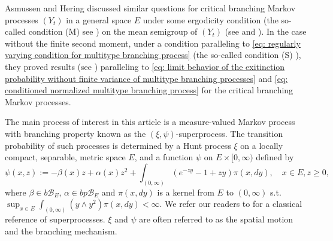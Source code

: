 \documentclass[12pt, a4paper]{amsart}
\theoremstyle{definition}
\numberwithin{equation}{section}
\begin{document}
	Asmussen and Hering \cite{AsmussenHering1983Branching} discussed similar questions for critical branching Markov processes $(Y_t)$ in a general space $E$ under some ergodicity condition (the so-called condition (M) see \cite[p.~156]{AsmussenHering1983Branching}) on the mean semigroup of $(Y_t)$ (see \cite[Section 6.3]{AsmussenHering1983Branching} and \cite[Section 6.4]{AsmussenHering1983Branching}).
	In the case without the finite second moment, under a condition  paralleling  to \eqref{eq: regularly varying condition for multitype branching process} (the so-called condition (S) \cite[p.~207]{AsmussenHering1983Branching}), they proved results (see \cite[Theorem 4.2]{AsmussenHering1983Branching}) paralleling to \eqref{eq: limit behavior of the exitinction probability without finite variance of multitype branching processes} and \eqref{eq: conditioned normalized multitype branching process} for the critical branching Markov processes.
	
	The main process of interest in this article is a measure-valued Markov process with branching property known as the $(\xi, \psi)$-superprocess.
	The transition probability of such processes is determined by a Hunt process $\xi$ on a locally compact, separable, metric space $E$, and a function $\psi$ on $E \times [0,\infty)$ defined by
\[ \label{eq: branching mechanism}
	\psi(x,z):=
	- \beta(x) z + \alpha (x) z^2 + \int_{(0,\infty)} (e^{-zy} - 1 + zy) \pi(x,dy),
	\quad x\in E, z\geq 0,
\]
	where $\beta \in b\mathscr B_E$, $\alpha \in bp\mathscr B_E$ and $\pi(x,dy)$ is a kernel from $E$ to $(0,\infty)$ s.t. $\sup_{x\in E} \int_{(0,\infty)} (y\wedge y^2) \pi(x,dy) < \infty$.
	We refer our readers to \cite{Li2011Measure-valued} for a classical reference of superprocesses.
	$\xi$ and $\psi$ are often referred to as the spatial motion and the branching mechanism.
\end{document}
